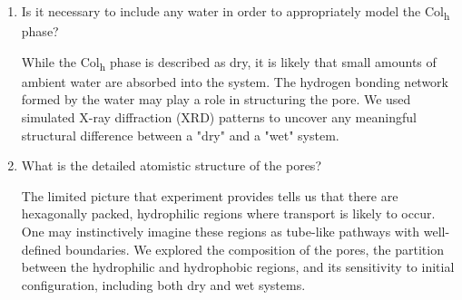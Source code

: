 \documentclass[journal=jpcbfk,manuscript=article]{achemso}
\begin{document}
\begin{enumerate}
        \item Is it necessary to include any water in order to appropriately model the 
        Col\textsubscript{h} phase? \label{point:water}

	While the Col\textsubscript{h} phase is described as dry, it is likely
	that small amounts of ambient water are absorbed into the system. The hydrogen
	bonding network formed by the water may play a role in structuring the pore. We
	used simulated X-ray diffraction (XRD) patterns to uncover any 
	meaningful structural difference between a "dry" and a "wet" system.

	\item What is the detailed atomistic structure of the pores?\label{point:composition}

	The limited picture that experiment provides tells us that there are hexagonally packed, 
	hydrophilic regions where transport is likely to occur. One may instinctively imagine these 
	regions as tube-like pathways with well-defined boundaries. We explored the composition
	of the pores, the partition between the hydrophilic and hydrophobic regions, and its 
	sensitivity to initial configuration, including both dry and wet systems. 

  \end{enumerate}
  
%
\end{document}

